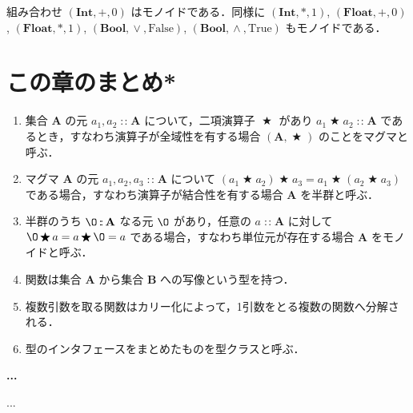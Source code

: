 \documentclass[a4paper,twocolumn]{jsbook}
\newcommand{\programminglanguage}[1]{\textsf{#1}}
\newcommand{\haskell}{\programminglanguage{Haskell}}
\newenvironment{note}[1]{\begin{boxnote}\begin{center}\textbf{#1}\end{center}}{\end{boxnote}}
\newcommand{\code}[1]{\texttt{#1}}
\newcommand{\mSpecialConstant}[1]{\textrm{#1}} %
\newcommand{\mFalse}{\mSpecialConstant{False}}
\newcommand{\mTrue}{\mSpecialConstant{True}}
\newcommand{\mZero}{\O}
\DeclareMathOperator{\mBinOp}{\bigstar}
\DeclareMathOperator{\mIn}{{:\!:}}
\DeclareMathOperator{\mLogicalAnd}{\wedge}
\DeclareMathOperator{\mLogicalOr}{\vee}
\DeclareMathOperator{\mPlus}{\maltese}
\newcommand{\mSet}[1]{\mathbf{#1}}
\newcommand{\mType}[1]{\mathbf{#1}}
\newcommand{\mBoolType}{\mType{Bool}}
\newcommand{\mFloatType}{\mType{Float}}
\newcommand{\mIntType}{\mType{Int}}
\newcommand{\mTupleWith}[1]{\left(#1\right)}
\newcommand{\mGenericTypeClass}[1]{\textsc{#1}} %
\newcommand{\mMonoidTypeClass}{\mGenericTypeClass{Monoid}}
\begin{document}
組み合わせ $\mTupleWith{\mIntType,+,0}$ はモノイドである．同様に $\mTupleWith{\mIntType,*,1}$, $\mTupleWith{\mFloatType,+,0}$, $\mTupleWith{\mFloatType,*,1}$, $\mTupleWith{\mBoolType,\mLogicalOr,\mFalse}$, $\mTupleWith{\mBoolType,\mLogicalAnd,\mTrue}$ もモノイドである．


\section{この章のまとめ*}

\begin{enumerate}
\item 集合 $\mSet{A}$ の元 $a_1,a_2\mIn\mSet{A}$ について，二項演算子 $\mBinOp$ があり $a_1\mBinOp a_2\mIn\mSet{A}$ であるとき，すなわち演算子が全域性を有する場合 $\mTupleWith{\mSet{A},\mBinOp}$ のことをマグマと呼ぶ．
\item マグマ $\mSet{A}$ の元 $a_1,a_2,a_3\mIn\mSet{A}$ について $(a_1\mBinOp a_2)\mBinOp a_3=a_1\mBinOp(a_2\mBinOp a_3)$ である場合，すなわち演算子が結合性を有する場合 $\mSet{A}$ を半群と呼ぶ．
\item 半群のうち $\mZero\mIn\mSet{A}$ なる元 $\mZero$ があり，任意の $a\mIn\mSet{A}$ に対して $\mZero\mBinOp a=a\mBinOp\mZero=a$ である場合，すなわち単位元が存在する場合 $\mSet{A}$ をモノイドと呼ぶ．
\item 関数は集合 $\mSet{A}$ から集合 $\mSet{B}$ への写像という型を持つ． %
\item 複数引数を取る関数はカリー化によって，1引数をとる複数の関数へ分解される．
\item 型のインタフェースをまとめたものを型クラスと呼ぶ． %
\end{enumerate}


\begin{note}{...}
...
\end{note}
\end{document}
